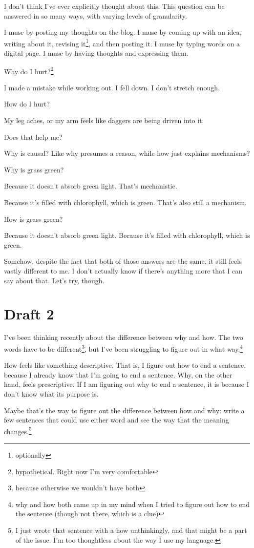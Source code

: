 \documentclass[12pt]{article}[titlepage]
\renewcommand{\,}{\textsuperscript{,}}
\begin{document}
I don't think I've ever explicitly thought about this.
This question can be answered in so many ways, with varying levels of granularity.

I muse by posting my thoughts on the blog.
I muse by coming up with an idea, writing about it, revising it\footnote{optionally}, and then posting it.
I muse by typing words on a digital page.
I muse by having thoughts and expressing them.

Why do I hurt?\footnote{hypothetical. Right now I'm very comfortable}

I made a mistake while working out.
I fell down.
I don't stretch enough.

How do I hurt?

My leg aches, or my arm feels like daggers are being driven into it.

Does that help me?

Why is causal?
Like why presumes a reason, while how just explains mechanisms?

Why is grass green?

Because it doesn't absorb green light.
That's mechanistic.

Because it's filled with chlorophyll, which is green.
That's also still a mechanism.

How is grass green?

Because it doesn't absorb green light.
Because it's filled with chlorophyll, which is green.

Somehow, despite the fact that both of those answers are the same, it still feels vastly different to me.
I don't actually know if there's anything more that I can say about that.
Let's try, though.
\section{Draft 2}
I've been thinking recently about the difference between why and how.
The two words have to be different\footnote{because otherwise we wouldn't have both}, but I've been struggling to figure out in what way.\footnote{why and how both came up in my mind when I tried to figure out how to end the sentence (though not there, which is a clue)}

How feels like something descriptive.
That is, I figure out how to end a sentence, because I already know that I'm going to end a sentence.
Why, on the other hand, feels prescriptive.
If I am figuring out why to end a sentence, it is because I don't know what its purpose is.

Maybe that's the way to figure out the difference between how and why: write a few sentences that could use either word and see the way that the meaning changes.\footnote{I just wrote that sentence with a how unthinkingly, and that might be a part of the issue. I'm too thoughtless about the way I use my language.}
\end{document}
